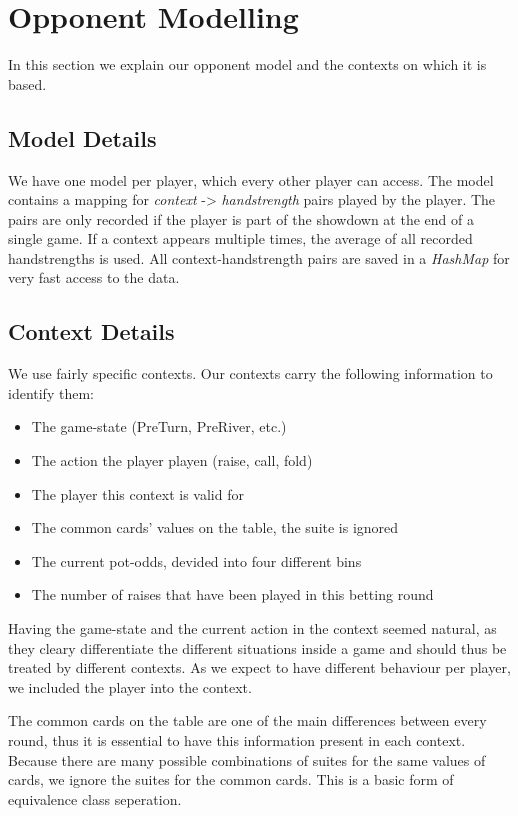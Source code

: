 \section{Opponent Modelling}
In this section we explain our opponent model and the contexts on which it is based.

\subsection{Model Details}
We have one model per player, which every other player can access. The model contains a mapping for \textit{context} ->
\textit{handstrength} pairs played by the player. The pairs are only recorded if the player is part of the showdown at
the end of a single game. If a context appears multiple times, the average of all recorded handstrengths is used. All
context-handstrength pairs are saved in a \textit{HashMap} for very fast access to the data.

\subsection{Context Details}
We use fairly specific contexts. Our contexts carry the following information to identify them:
\begin{itemize}
    \item The game-state (PreTurn, PreRiver, etc.)
    \item The action the player playen (raise, call, fold)
    \item The player this context is valid for
    \item The common cards' values on the table, the suite is ignored
    \item The current pot-odds, devided into four different bins
    \item The number of raises that have been played in this betting round
\end{itemize}
Having the game-state and the current action in the context seemed natural, as they cleary differentiate the different
situations inside a game and should thus be treated by different contexts. As we expect to have different behaviour per
player, we included the player into the context.

The common cards on the table are one of the main differences between every round, thus it is essential to have this
information present in each context. Because there are many possible combinations of suites for the same values of
cards, we ignore the suites for the common cards. This is a basic form of equivalence class seperation.

